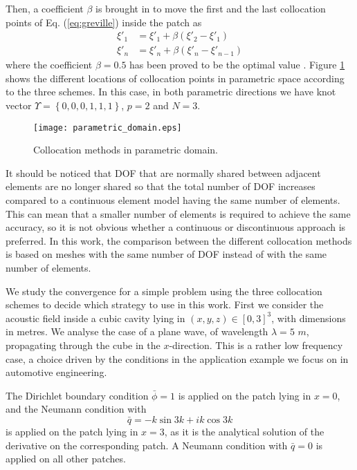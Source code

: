 \documentclass[review]{elsarticle}
\begin{document}
Then, a coefficient $\beta$ is brought in to move the first and the last collocation points of Eq. (\ref{eq:greville}) inside the patch as
\begin{align}
\xi'_{1} &= \xi'_{1}+\beta(\xi'_{2}-\xi'_{1})\\
\xi'_{n} &= \xi'_{n}+\beta(\xi'_{n}-\xi'_{n-1})
\end{align}
where the coefficient $\beta = 0.5$ has been proved to be the optimal value \cite{YWang}. Figure \ref{Gre_parameter} shows the different locations of collocation points in parametric space according to the three schemes. In this case, in both parametric directions we have knot vector $\Upsilon= \left\{0,0,0,1,1,1\right\}$, $p=2$ and $N=3$.
\begin{figure}[!htb]
\centering
\texttt{[image: parametric\_domain.eps]} 
\caption{Collocation methods in parametric domain.}\label{Gre_parameter}                                                                                                                                                                                                                                
\end{figure}

It should be noticed that DOF that are normally shared between adjacent elements are no longer shared so that the total number of DOF increases compared to a continuous element model having the same number of elements. This can mean that a smaller number of elements is required to achieve the same accuracy, so it is not obvious whether a continuous or discontinuous approach is preferred. In this work, the comparison between the different collocation methods is based on meshes with the same number of DOF instead of with the same number of elements.

We study the convergence for a simple problem using the three collocation schemes to decide which strategy to use in this work. First we consider the acoustic field inside a cubic cavity lying in $(x,y,z)\in [0,3]^3$, with dimensions in metres. We analyse the case of a plane wave, of wavelength $\lambda=5$ $m$, propagating through the cube in the $x$-direction. This is a rather low frequency case, a choice driven by the conditions in the application example we focus on in automotive engineering.


The Dirichlet boundary condition $\bar{\phi}=1$ is applied on the patch lying in $x=0$, and the Neumann condition with
\begin{equation}
\bar{q}=-k \sin{3k}+i k \cos{3k}
\end{equation} 
is applied on the patch lying in $x=3$, as it is the analytical solution of the derivative on the corresponding patch. A Neumann condition with $\bar{q}=0$ is applied on all other patches. 
\end{document}
